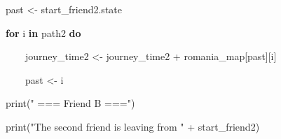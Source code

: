 \documentclass[12pt]{article}
\begin{document}
\begin{adjustwidth}{0.5in}{0.0in}
\begin{justify}
{\fontsize{8pt}{9.6pt}\selectfont \ \ \  past <- start\_friend2.state\par}
\end{justify}\par

\end{adjustwidth}

\begin{adjustwidth}{0.5in}{0.0in}
\begin{justify}
{\fontsize{8pt}{9.6pt}\selectfont \ \ \  \textbf{for }i \textbf{in} path2\textbf{ do}\par}
\end{justify}\par

\end{adjustwidth}

\begin{adjustwidth}{0.5in}{0.0in}
\begin{justify}
{\fontsize{8pt}{9.6pt}\selectfont \ \ \ \ \ \ \  journey\_time2 <- journey\_time2 + romania\_map[past][i]\par}
\end{justify}\par

\end{adjustwidth}

\begin{adjustwidth}{0.5in}{0.0in}
\begin{justify}
{\fontsize{8pt}{9.6pt}\selectfont \ \ \ \ \ \ \  past <- i\par}
\end{justify}\par

\end{adjustwidth}

\begin{adjustwidth}{0.5in}{0.0in}
\begin{justify}
{\fontsize{8pt}{9.6pt}\selectfont \ \ \  print(" === Friend B ===")\par}
\end{justify}\par

\end{adjustwidth}

\begin{adjustwidth}{0.5in}{0.0in}
\begin{justify}
{\fontsize{8pt}{9.6pt}\selectfont \ \ \  print("The second friend is leaving from " + start\_friend2)\par}
\end{justify}\par

\end{adjustwidth}
\end{document}
